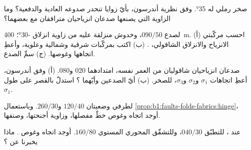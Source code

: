 \begin{exercise}[$\star$]\label{exo:b1:faults-folds-fabrics:4}
صخر رملي له  \ang{35}. وفق نظرية أندرسون، بأيّ زوايا تنحدر صدوعه العادية والدفعية؟ وما الزاوية التي يصنعها صدعان انزياحيان مترافقان مع بعضهما؟
\end{exercise}

\begin{exercise}[$\star\star$]\label{exo:b1:faults-folds-fabrics:5}
لصدع  $090/50$، وخدوش منزلقة عليه من زاوية انزلاق \ang{-30}؛  \qty{400}{m}. (أ) احسب مركّبتي الانزياح والانزلاق الشاقولي،  . (ب) اكتب  بمركّبات شرقية وشمالية وعلوية، وأعطِ اتجاهها وغوصها. (ج) سمِّ الصدع.
\end{exercise}

\begin{exercise}[$\star\star$]\label{exo:b1:faults-folds-fabrics:6}
صدعان انزياحيان شاقوليان من العمر نفسه، امتدادهما $020$ و$080$. (أ) وفق أندرسون، أعطِ اتجاهات $\sigma_1$ و$\sigma_2$ و$\sigma_3$،  للصخر. (ب) أيّ الصدعين  وأيّهما ؟ استدلّ بالقصر على طول $\sigma_1$.
\end{exercise}

\begin{exercise}[$\star\star$]\label{exo:b1:faults-folds-fabrics:7}
لطرفي  وضعيتان $120/40$ و$260/30$. وباستعمال \cref{prop:b1:faults-folds-fabrics:hinge}، أوجد اتجاه وغوص خطّ مفصلها، وزاوية أجنحتها، وصنفها.
\end{exercise}

\begin{exercise}[$\star\star$]\label{exo:b1:faults-folds-fabrics:8}
عند ، للتطبّق  $040/30$، وللتشقّق المحوري المستوي  $160/80$. أوجد اتجاه وغوص . ماذا يخبرنا عن ؟
\end{exercise}

